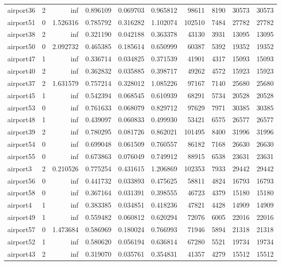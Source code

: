 \begin{longtable}{|l|r|r|r|r|r|r|r|r|r|}
airport36 & 2 & inf & 0.896109 & 0.069703 & 0.965812 & 98611 & 8190 & 30573 & 30573 \\
airport51 & 0 & 1.526316 & 0.785792 & 0.316282 & 1.102074 & 102510 & 7484 & 27782 & 27782 \\
airport38 & 2 & inf & 0.321190 & 0.042188 & 0.363378 & 43130 & 3931 & 13095 & 13095 \\
airport50 & 0 & 2.092732 & 0.465385 & 0.185614 & 0.650999 & 60387 & 5392 & 19352 & 19352 \\
airport47 & 1 & inf & 0.336714 & 0.034825 & 0.371539 & 41901 & 4317 & 15093 & 15093 \\
airport40 & 2 & inf & 0.362832 & 0.035885 & 0.398717 & 49262 & 4572 & 15923 & 15923 \\
airport37 & 2 & 1.631579 & 0.757214 & 0.328012 & 1.085226 & 97167 & 7140 & 25680 & 25680 \\
airport45 & 1 & inf & 0.542394 & 0.068545 & 0.610939 & 68291 & 5734 & 20528 & 20528 \\
airport53 & 0 & inf & 0.761633 & 0.068079 & 0.829712 & 97629 & 7971 & 30385 & 30385 \\
airport48 & 1 & inf & 0.439097 & 0.060833 & 0.499930 & 53421 & 6575 & 26577 & 26577 \\
airport39 & 2 & inf & 0.780295 & 0.081726 & 0.862021 & 101495 & 8400 & 31996 & 31996 \\
airport54 & 0 & inf & 0.699048 & 0.061509 & 0.760557 & 86182 & 7168 & 26630 & 26630 \\
airport55 & 0 & inf & 0.673863 & 0.076049 & 0.749912 & 88915 & 6538 & 23631 & 23631 \\
airport3 & 2 & 0.210526 & 0.775254 & 0.431615 & 1.206869 & 102353 & 7933 & 29442 & 29442 \\
airport56 & 0 & inf & 0.441732 & 0.033893 & 0.475625 & 58811 & 4824 & 16793 & 16793 \\
airport58 & 0 & inf & 0.367164 & 0.031391 & 0.398555 & 46723 & 4379 & 15180 & 15180 \\
airport4 & 1 & inf & 0.383385 & 0.034851 & 0.418236 & 47821 & 4428 & 14909 & 14909 \\
airport49 & 1 & inf & 0.559482 & 0.060812 & 0.620294 & 72076 & 6005 & 22016 & 22016 \\
airport57 & 0 & 1.473684 & 0.586969 & 0.180024 & 0.766993 & 71946 & 5894 & 21318 & 21318 \\
airport52 & 1 & inf & 0.580620 & 0.056194 & 0.636814 & 67280 & 5521 & 19734 & 19734 \\
airport43 & 2 & inf & 0.319070 & 0.035761 & 0.354831 & 41357 & 4279 & 15512 & 15512 \\

\end{longtable}
